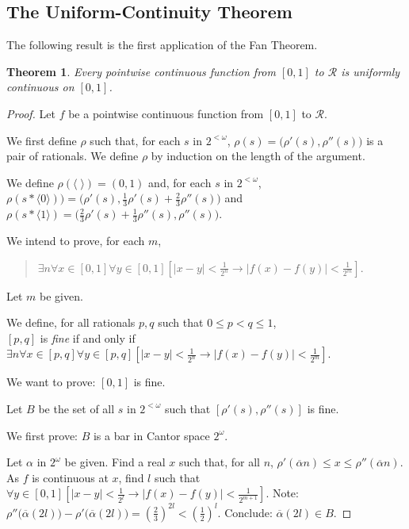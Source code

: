 \documentclass[a4paper]{amsart}
\theoremstyle{plain}
\newtheorem{theorem}{Theorem}
\begin{document}
\subsection{The Uniform-Continuity Theorem}
The following result is the first application of the Fan Theorem.
\begin{theorem}\label{T:uct} Every pointwise continuous function from $[0,1]$ to $\mathcal{R}$ is uniformly continuous on $[0,1]$.\end{theorem}

\begin{proof} Let $f$ be a pointwise continuous function from $[0,1]$ to $\mathcal{R}$. 

We first define $\rho$ such that, for each $s$ in $2^{<\omega}$, $\rho(s)=\bigl(\rho'(s), \rho''(s)\bigr)$ is a pair of rationals.   We define $\rho$ by induction on the length of the argument.

We define $\rho(\langle\;\rangle)= (0,1)$ and, for each $s$ in $2^{<\omega}$, \\$\rho(s\ast \langle 0 \rangle))= \bigl(\rho'(s), \frac{1}{3}\rho'(s) + \frac{2}{3}\rho''(s)\bigr)$ and $\rho(s\ast\langle 1 \rangle)=\bigl(\frac{2}{3}\rho'(s) +\frac{1}{3}\rho''(s), \rho''(s)\bigr)$.

\smallskip
We intend to prove, for each $m$, \begin{quote} $\exists n \forall x \in [0,1]\forall y \in [0,1][|x-y|<\frac{1}{2^n}\rightarrow |f(x)-f(y)|<\frac{1}{2^m}]$. \end{quote}


Let $m$ be given.

We define, for all rationals $p,q$ such that $0\le p < q\le 1$, \\$[p,q]$ is \emph{fine} if and only if  $\exists n \forall x \in [p,q]\forall y \in [p,q][|x-y|<\frac{1}{2^n}\rightarrow |f(x)-f(y)|<\frac{1}{2^m}]$.

We want to prove: $[0,1]$ is fine.

Let $B$ be the set of all $s$ in $2^{<\omega}$ such that
$[\rho'(s), \rho''(s)]$ is fine.

We first prove: $B$ is a bar in Cantor space $2^\omega$. 

Let $\alpha$ in $2^\omega$ be given. Find a real $x$ such that, for all $n$, $\rho'(\overline \alpha n)\le x \le \rho''(\overline \alpha n)$. As $f$ is continuous at $x$, find $l$ such that $\forall y \in [0,1][|x-y|<\frac{1}{2^l} \rightarrow |f(x)-f(y)|<\frac{1}{2^{m+1}}]$. Note: $\rho''\bigl(\overline \alpha(2l)\bigr)-\rho'\bigl(\overline \alpha(2l)\bigr)= (\frac{2}{3})^{2l}<(\frac{1}{2})^l$. Conclude: $\overline \alpha(2l)\in B$.


\end{proof}
\end{document}
